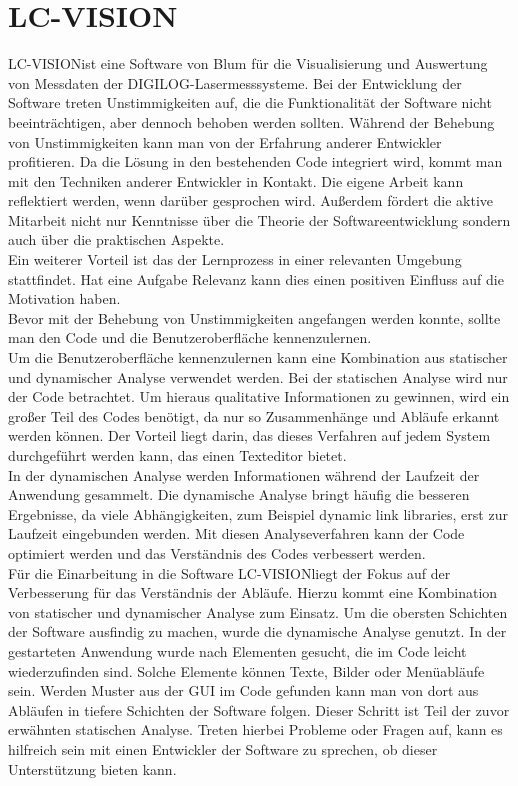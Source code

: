 \section{LC-VISION}
\glqq LC-VISION\grqq\space ist eine Software von \ac{Blum} für die Visualisierung und Auswertung von Messdaten der \glqq DIGILOG-Lasermesssysteme\grqq.
Bei der Entwicklung der Software treten Unstimmigkeiten auf, die die Funktionalität der Software nicht beeinträchtigen, aber dennoch behoben werden sollten.
Während der Behebung von Unstimmigkeiten kann man von der Erfahrung anderer Entwickler profitieren. Da die Lösung in den bestehenden Code integriert wird, kommt man mit den Techniken anderer Entwickler in Kontakt. Die eigene Arbeit kann reflektiert werden\cite{34908}, wenn darüber gesprochen wird. Außerdem fördert die aktive Mitarbeit nicht nur Kenntnisse über die Theorie der Softwareentwicklung sondern auch über die praktischen Aspekte\cite{34908}.\\
Ein weiterer Vorteil ist das der Lernprozess in einer relevanten Umgebung stattfindet\cite{34908}.
Hat eine Aufgabe Relevanz kann dies einen positiven Einfluss auf die Motivation haben. \\
Bevor mit der Behebung von Unstimmigkeiten angefangen werden konnte, sollte man den Code und die Benutzeroberfläche kennenzulernen. \\
Um die Benutzeroberfläche kennenzulernen kann eine Kombination aus statischer und dynamischer Analyse verwendet werden. Bei der statischen Analyse wird nur der Code betrachtet. Um hieraus qualitative Informationen zu gewinnen, wird ein großer Teil des Codes benötigt, da nur so Zusammenhänge und Abläufe erkannt werden können\cite{mock2003dynamic}. Der Vorteil liegt darin, das dieses Verfahren auf jedem System durchgeführt werden kann, das einen Texteditor bietet. \\
In der dynamischen Analyse werden Informationen während der Laufzeit der Anwendung gesammelt. Die dynamische Analyse bringt häufig die besseren Ergebnisse, da viele Abhängigkeiten, zum Beispiel \glqq dynamic link libraries\grqq, erst zur Laufzeit eingebunden werden.
Mit diesen Analyseverfahren kann der Code optimiert werden und das Verständnis des Codes verbessert werden\cite{mock2003dynamic}.\\
Für die Einarbeitung in die Software \glqq LC-VISION\grqq\space liegt der Fokus auf der Verbesserung für das Verständnis der Abläufe. Hierzu kommt eine Kombination von statischer und dynamischer Analyse zum Einsatz. Um die obersten Schichten der Software ausfindig zu machen, wurde die dynamische Analyse genutzt. In der gestarteten Anwendung wurde nach Elementen gesucht, die im Code leicht wiederzufinden sind. Solche Elemente können Texte, Bilder oder Menüabläufe sein. Werden Muster aus der \ac{GUI} im Code gefunden kann man von dort aus Abläufen in tiefere Schichten der Software folgen. Dieser Schritt ist Teil der zuvor erwähnten statischen Analyse. Treten hierbei Probleme oder Fragen auf, kann es hilfreich sein mit einen Entwickler der Software zu sprechen, ob dieser Unterstützung bieten kann.\\
